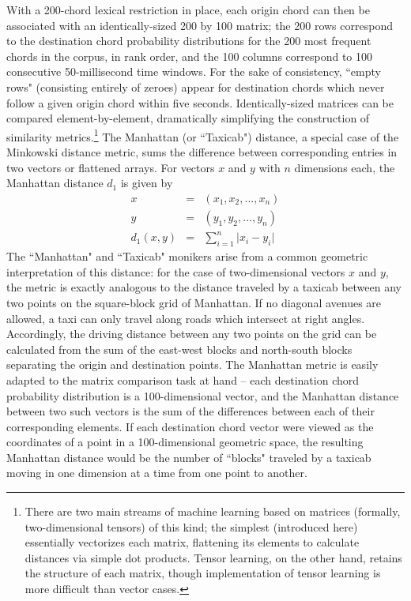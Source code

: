 With a 200-chord lexical restriction in place, each origin chord can then be associated with an identically-sized 200 by 100 matrix; the 200 rows correspond to the destination chord probability distributions for the 200 most frequent chords in the corpus, in rank order, and the 100 columns correspond to 100 consecutive 50-millisecond time windows.  For the sake of consistency, ``empty rows" (consisting entirely of zeroes) appear for destination chords which never follow a given origin chord within five seconds.  Identically-sized matrices can be compared element-by-element, dramatically simplifying the construction of similarity metrics.\footnote{There are two main streams of machine learning based on matrices (formally, two-dimensional tensors) of this kind; the simplest (introduced here) essentially vectorizes each matrix, flattening its elements to calculate distances via simple dot products.  Tensor learning, on the other hand, retains the structure of each matrix, though implementation of tensor learning is more difficult than vector cases.}  The Manhattan (or ``Taxicab") distance, a special case of the Minkowski distance metric, sums the difference between corresponding entries in two vectors or flattened arrays.  For vectors $x$ and $y$ with $n$ dimensions each, the Manhattan distance $d_1$ is given by
\begin{eqnarray*}
x &=& (x_1,x_2,...,x_n) \\
y &=& (y_1,y_2,...,y_n) \\
d_1(x,y) &=& \sum_{i=1}^n \lvert x_i - y_i \rvert
\end{eqnarray*}
The ``Manhattan" and ``Taxicab" monikers arise from a common geometric interpretation of this distance: for the case of two-dimensional vectors $x$ and $y$, the metric is exactly analogous to the distance traveled by a taxicab between any two points on the square-block grid of Manhattan.  If no diagonal avenues are allowed, a taxi can only travel along roads which intersect at right angles.  Accordingly, the driving distance between any two points on the grid can be calculated from the sum of the east-west blocks and north-south blocks separating the origin and destination points.  The Manhattan metric is easily adapted to the matrix comparison task at hand -- each destination chord probability distribution is a 100-dimensional vector, and the Manhattan distance between two such vectors is the sum of the differences between each of their corresponding elements.  If each destination chord vector were viewed as the coordinates of a point in a 100-dimensional geometric space, the resulting Manhattan distance would be the number of ``blocks" traveled by a taxicab moving in one dimension at a time from one point to another.

